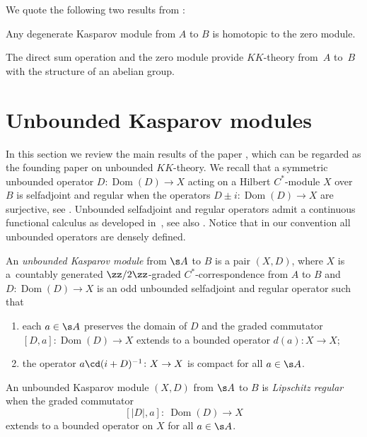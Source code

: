 We quote the following two results from \cite[Chapter~17]{Bla:KOA}:

\begin{prop}\label{p:degbou}Any degenerate Kasparov module from $A$ to $B$ is homotopic to the zero module.
\end{prop}

\begin{Theorem}The direct sum operation and the zero module provide $KK$-theory from~$A$ to~$B$ with the structure of an abelian group.
\end{Theorem}

\section{Unbounded Kasparov modules}
In this section we review the main results of the paper \cite{BaJu:TBK}, which can be regarded as the founding paper on unbounded $KK$-theory. We recall that a symmetric unbounded operator $D\colon \operatorname{Dom}(D) \to X$ acting on a Hilbert $C^*$-module $X$ over $B$ is selfadjoint and regular when the operators $D \pm i\colon \operatorname{Dom}(D) \to X$ are surjective, see \cite[Lemmas~9.7 and~9.8]{Lan:HCM}. Unbounded selfadjoint and regular operators admit a continuous functional calculus as developed in~\cite{Wor:UAQ,WoNa:OTC}, see also \cite[Theorem~10.9]{Lan:HCM}. Notice that in our convention all unbounded operators are densely defined.

\begin{dfn}\label{d:unbkas}
An \emph{unbounded Kasparov module} from $\s A$ to $B$ is a pair $(X,D)$, where $X$ is a~countably generated $\zz/2\zz$-graded $C^*$-correspondence from $A$ to $B$ and $D \colon \operatorname{Dom}(D) \to X$ is an odd unbounded selfadjoint and regular operator such that
\begin{enumerate}\itemsep=0pt
\item[1)] each $a \in \s A$ preserves the domain of $D$ and the graded commutator $[D,a]\colon \operatorname{Dom}(D) \to X$ extends to a bounded operator $d(a)\colon X \to X$;
\item[2)] the operator $a \cd (i + D)^{-1}\colon X \to X$ is compact for all $a \in \s A$.
\end{enumerate}

An unbounded Kasparov module $(X,D)$ from $\s A$ to $B$ is \emph{Lipschitz regular} when the graded commutator
\[
[|D|,a] \colon \ \operatorname{Dom}(D) \to X
\]
extends to a bounded operator on $X$ for all $a \in \s A$.
\end{dfn}

